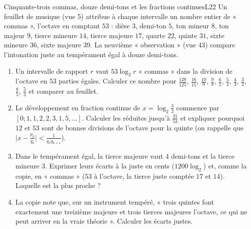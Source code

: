 \documentclass[11pt,a4paper]{article}
\begin{document}
\begin{exercice}{Cinquante-trois commas, douze demi-tons et les fractions continues}{L2}{2}
Un feuillet de musique (vue 5) attribue à chaque intervalle un nombre entier de
« commas », l'octave en comptant $53$ : dièse $3$, demi-ton $5$, ton mineur $8$, ton
majeur $9$, tierce mineure $14$, tierce majeure $17$, quarte $22$, quinte $31$,
sixte mineure $36$, sixte majeure $39$. La neuvième « observation » (vue 43)
compare l'intonation juste au tempérament égal à douze demi-tons.
\begin{enumerate}
\item Un intervalle de rapport $r$ vaut $53\log_2 r$ « commas » dans la division
  de l'octave en $53$ parties égales. Calculer ce nombre pour $\frac{128}{125}$,
  $\frac{16}{15}$, $\frac{10}{9}$, $\frac98$, $\frac65$, $\frac54$, $\frac43$, $\frac32$,
  $\frac85$, $\frac53$ et comparer au feuillet.
\item Le développement en fraction continue de $x = \log_2\frac32$ commence par
  $[0; 1, 1, 2, 2, 3, 1, 5, \dots]$. Calculer les réduites jusqu'à $\frac{31}{53}$ et
  expliquer pourquoi $12$ et $53$ sont de bonnes divisions de l'octave pour la
  quinte (on rappelle que $\bigl|x - \frac{p_k}{q_k}\bigr| < \frac{1}{q_kq_{k+1}}$).
\item Dans le tempérament égal, la tierce majeure vaut $4$ demi-tons et la tierce
  mineure $3$. Exprimer leurs écarts à la juste en cents ($1200\log_2$) et, comme la
  copie, en « commas » ($53$ à l'octave, la tierce juste comptée $17$ et $14$).
  Laquelle est la plus proche ?
\item La copie note que, sur un instrument tempéré, « trois quintes font
  exactement une treizième majeure et trois tierces majeures l'octave, ce qui ne
  peut arriver en la vraie théorie ». Calculer les écarts justes.
\end{enumerate}
\end{exercice}
\end{document}
